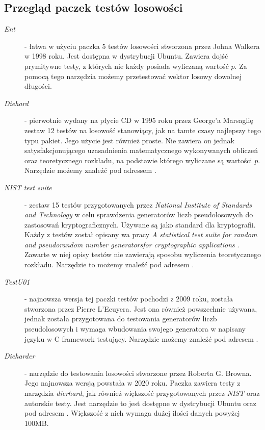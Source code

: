 \subsection{Przegląd paczek testów losowości}
\begin{description}
    \item[\textit{Ent}] - łatwa w użyciu paczka 5 testów losowości stworzona przez Johna Walkera w 1998 roku. Jest dostępna w dystrybucji Ubuntu. Zawiera dojść prymitywne testy, z których nie każdy posiada wyliczaną wartość $p$. Za pomocą tego narzędzia możemy przetestować wektor losowy dowolnej długości.
    \item[\textit{Diehard}] - pierwotnie wydany na płycie CD w 1995 roku przez George'a Marsaglię zestaw 12 testów na losowość stanowiący, jak na tamte czasy najlepszy tego typu pakiet. Jego użycie jest również proste. Nie zawiera on jednak satysfakcjonującego uzasadnienia matematycznego wykonywanych obliczeń oraz teoretycznego rozkładu, na podstawie którego wyliczane są wartości $p$. Narzędzie możemy znaleźć pod adressem \cite{Diehard}.
    \item[\textit{NIST test suite}] - zestaw 15 testów przygotowanych przez \textit{National Institute of Standards and Technology} w celu sprawdzenia generatorów liczb pseudolosowych do zastosowań kryptograficznych. Używane są jako standard dla kryptografii. Każdy z testów został opisany wa pracy \emph{A statistical test suite for random and pseudorandom number generatorsfor cryptographic applications} \cite{nist}. Zawarte w niej opisy testów nie zawierają sposobu wyliczenia teoretycznego rozkładu. Narzędzie to możemy znaleźć pod adresem \cite{NISTTests}.
    \item[\textit{TestU01}] - najnowsza wersja tej paczki testów pochodzi z 2009 roku, została stworzona przez Pierre L'Ecuyera. Jest ona również powszechnie używana, jednak została przygotowana do testowania generatorów liczb pseudolosowych i wymaga wbudowania swojego generatora w napisany języku w C framework testujący. Narzędzie możemy znaleźć pod adresem \cite{TestU01}.
    \item[\textit{Dieharder}] - narzędzie do testowania losowości stworzone przez Roberta G. Browna. Jego najnowsza wersją powstała w 2020 roku. Paczka zawiera testy z narzędzia \emph{dierhard}, jak również większość przygotowanych przez \emph{NIST} oraz autorskie testy. Jest narzędzie to jest dostępne w dystrybucji Ubuntu oraz pod adresem \cite{Dieharder}. Większość z nich wymaga dużej ilości danych powyżej 100MB. 
\end{description}
